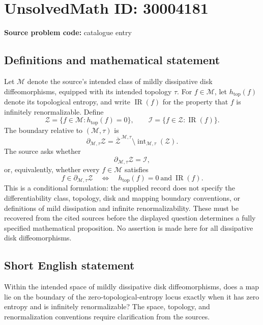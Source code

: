 \documentclass[11pt]{article}
\begin{document}
\section*{UnsolvedMath ID: 30004181}
\textbf{Source problem code:} catalogue entry
\subsection{Definitions and mathematical statement}
Let \(\mathcal M\) denote the source's intended class of mildly dissipative disk diffeomorphisms, equipped with its intended topology \(\tau\). For \(f\in\mathcal M\), let \(h_{\mathrm{top}}(f)\) denote its topological entropy, and write \(\operatorname{IR}(f)\) for the property that \(f\) is infinitely renormalizable. Define
\[
\mathcal Z=\{f\in\mathcal M:h_{\mathrm{top}}(f)=0\},\qquad
\mathcal I=\{f\in\mathcal Z:\operatorname{IR}(f)\}.
\]
The boundary relative to \((\mathcal M,\tau)\) is
\[
\partial_{\mathcal M,\tau}\mathcal Z
=\overline{\mathcal Z}^{\,\mathcal M,\tau}
\setminus\operatorname{int}_{\mathcal M,\tau}(\mathcal Z).
\]
The source asks whether
\[
\partial_{\mathcal M,\tau}\mathcal Z=\mathcal I,
\]
or, equivalently, whether every \(f\in\mathcal M\) satisfies
\[
f\in\partial_{\mathcal M,\tau}\mathcal Z
\quad\Longleftrightarrow\quad
h_{\mathrm{top}}(f)=0\ \text{and}\ \operatorname{IR}(f).
\]
This is a conditional formulation: the supplied record does not specify the differentiability class, topology, disk and mapping boundary conventions, or definitions of mild dissipation and infinite renormalizability. These must be recovered from the cited sources before the displayed question determines a fully specified mathematical proposition. No assertion is made here for all dissipative disk diffeomorphisms.
\subsection{Short English statement}
Within the intended space of mildly dissipative disk diffeomorphisms, does a map lie on the boundary of the zero-topological-entropy locus exactly when it has zero entropy and is infinitely renormalizable? The space, topology, and renormalization conventions require clarification from the sources.
\end{document}
